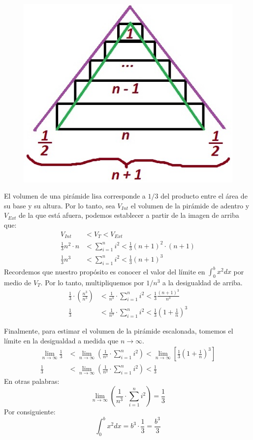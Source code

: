 \documentclass[12pt]{article}
\begin{document}
\begin{figure}[hbt!]
\centering
\includegraphics[scale=0.4]{img/riemann-pyramid-2.jpg}
\end{figure}

El volumen de una pirámide lisa corresponde a $1/3$ del producto entre el área de su base y su altura. Por lo tanto, sea $V_{Int}$ el volumen de la pirámide de adentro y $V_{Ext}$ de la que está afuera, podemos establecer a partir de la imagen de arriba que:
\begin{align*}
  V_{Int} &< V_{T} < V_{Ext} \\
  \frac{1}{3} n^{2} \cdot n &< \sum_{i = 1}^{n} i^{2} < \frac{1}{3} (n + 1)^{2} \cdot (n + 1) \\
  \frac{1}{3} n^{3} &< \sum_{i = 1}^{n} i^{2} < \frac{1}{3} (n + 1)^{3}
\end{align*}
Recordemos que nuestro propósito es conocer el valor del límite en $\int_{0}^{b} x^{2} dx$ por medio de $V_{T}$. Por lo tanto, multipliquemos por $1/n^{3}$ a la desigualdad de arriba.
\begin{align*}
  \frac{1}{3} \cdot \left(\frac{n^{3}}{n^{3}}\right) &<
  \frac{1}{n^{3}} \cdot \sum_{i = 1}^{n} i^{2} <
  \frac{1}{3} \frac{(n + 1)^{3}}{n^{3}} \\
  \frac{1}{3} &<
  \frac{1}{n^{3}} \cdot \sum_{i = 1}^{n} i^{2} <
  \frac{1}{3} \left(1 + \frac{1}{n}\right)^{3}
\end{align*}

Finalmente, para estimar el volumen de la pirámide escalonada, tomemos el límite en la desigualdad a medida que $n \to \infty$.
\begin{align*}
  \lim_{n \to \infty} \frac{1}{3} &<
  \lim_{n \to \infty} \left(\frac{1}{n^{3}} \cdot \sum_{i = 1}^{n} i^{2}\right) <
  \lim_{n \to \infty} \left[\frac{1}{3} \left(1 + \frac{1}{n}\right)^{3}\right] \\
  \frac{1}{3} &<
  \lim_{n \to \infty} \left(\frac{1}{n^{3}} \cdot \sum_{i = 1}^{n} i^{2}\right) <
  \frac{1}{3}
\end{align*}
En otras palabras:
\[
  \lim_{n \to \infty} \left(\frac{1}{n^{3}} \cdot \sum_{i = 1}^{n} i^{2}\right) = \frac{1}{3}
\]
Por consiguiente:
\[
  \int_{0}^{b} x^{2} dx = b^{3} \cdot \frac{1}{3} = \frac{b^{3}}{3}
\]
\end{document}

